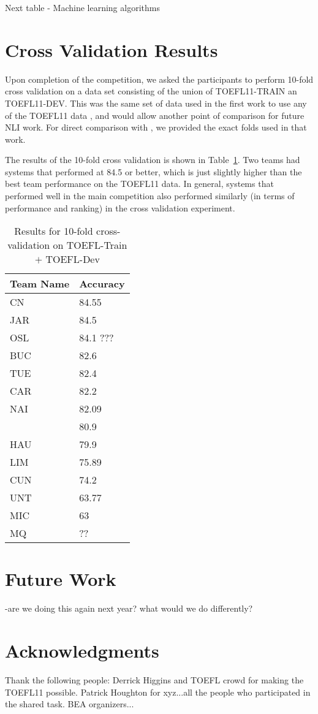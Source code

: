 \documentclass[11pt,letterpaper]{article}
\begin{document}
Next table - Machine learning algorithms


\section{Cross Validation Results}
Upon completion of the competition, we asked the participants to
perform 10-fold cross validation on a data set consisting of the union
of TOEFL11-TRAIN an TOEFL11-DEV.  This was the same set of data
used in the first work to use any of the TOEFL11 data 
\cite{tetreault-EtAl:2012:PAPERS}, and would allow another point of 
comparison for future NLI work.  For direct comparison with 
\cite{tetreault-EtAl:2012:PAPERS}, we provided the exact folds used in 
that work.  

The results of the 10-fold cross validation is shown in Table~\ref{tab:10fold}.
Two teams had systems that performed at 84.5 or better, which is just 
slightly higher than the best team performance on the TOEFL11 data.  In
general, systems that performed well in the main competition also
performed similarly (in terms of performance and ranking) in the
cross validation experiment.


\begin{table}[htbp]
\begin{tabular}{|l|l|}
\hline
Team Name & Accuracy\\ \hline
CN & 84.55 \\ \hline
JAR & 84.5 \\ \hline
OSL & 84.1 ???\\ \hline
BUC & 82.6 \\ \hline
TUE & 82.4 \\ \hline
CAR & 82.2 \\ \hline
NAI & 82.09 \\ \hline
\cite{tetreault-EtAl:2012:PAPERS} &  80.9 \\ \hline
HAU & 79.9 \\ \hline
LIM & 75.89  \\ \hline
CUN & 74.2\\ \hline
UNT  & 63.77 \\ \hline
MIC & 63 \\ \hline
MQ  & ?? \\ \hline

\end{tabular}
\caption{Results for 10-fold cross-validation on TOEFL-Train $+$ TOEFL-Dev \label{tab:10fold}}
\end{table}

\section{Future Work} -are we doing this again next year?  what would we do differently?


\section*{Acknowledgments}

Thank the following people:  Derrick Higgins and TOEFL crowd for
making the TOEFL11 possible.  Patrick Houghton for xyz...all the people
who participated in the shared task.  BEA organizers...





\end{document}
